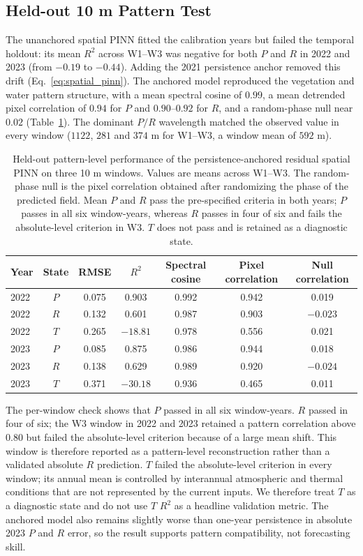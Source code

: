 \documentclass[preprint,review,12pt,3p]{elsarticle}
\begin{document}
\subsection{Held-out 10 m Pattern Test}
\label{subsec:spatial_pattern_results}

The unanchored spatial PINN fitted the calibration years but failed the temporal holdout: its mean $R^2$ across W1--W3 was negative for both $P$ and $R$ in 2022 and 2023 (from $-0.19$ to $-0.44$). Adding the 2021 persistence anchor removed this drift (Eq.~\ref{eq:spatial_pinn}). The anchored model reproduced the vegetation and water pattern structure, with a mean spectral cosine of $0.99$, a mean detrended pixel correlation of $0.94$ for $P$ and $0.90$--$0.92$ for $R$, and a random-phase null near $0.02$ (Table~\ref{tab:spatial_pattern}). The dominant $P/R$ wavelength matched the observed value in every window ($1122$, $281$ and $374$ m for W1--W3, a window mean of $592$ m).

\begin{table}[htbp]
	\centering
	\caption{Held-out pattern-level performance of the persistence-anchored residual spatial PINN on three 10 m windows. Values are means across W1--W3. The random-phase null is the pixel correlation obtained after randomizing the phase of the predicted field. Mean $P$ and $R$ pass the pre-specified criteria in both years; $P$ passes in all six window-years, whereas $R$ passes in four of six and fails the absolute-level criterion in W3. $T$ does not pass and is retained as a diagnostic state.}
	\label{tab:spatial_pattern}
	\begin{tabular}{lcccccc}
		\toprule
		Year & State & RMSE & $R^2$ & Spectral cosine & Pixel correlation & Null correlation \\
		\midrule
		2022 & $P$ & 0.075 & 0.903 & 0.992 & 0.942 & 0.019 \\
		2022 & $R$ & 0.132 & 0.601 & 0.987 & 0.903 & $-0.023$ \\
		2022 & $T$ & 0.265 & $-18.81$ & 0.978 & 0.556 & 0.021 \\
		2023 & $P$ & 0.085 & 0.875 & 0.986 & 0.944 & 0.018 \\
		2023 & $R$ & 0.138 & 0.629 & 0.989 & 0.920 & $-0.024$ \\
		2023 & $T$ & 0.371 & $-30.18$ & 0.936 & 0.465 & 0.011 \\
		\bottomrule
	\end{tabular}
\end{table}

The per-window check shows that $P$ passed in all six window-years. $R$ passed in four of six; the W3 window in 2022 and 2023 retained a pattern correlation above $0.80$ but failed the absolute-level criterion because of a large mean shift. This window is therefore reported as a pattern-level reconstruction rather than a validated absolute $R$ prediction. $T$ failed the absolute-level criterion in every window; its annual mean is controlled by interannual atmospheric and thermal conditions that are not represented by the current inputs. We therefore treat $T$ as a diagnostic state and do not use $T$ $R^2$ as a headline validation metric. The anchored model also remains slightly worse than one-year persistence in absolute 2023 $P$ and $R$ error, so the result supports pattern compatibility, not forecasting skill.
\end{document}
